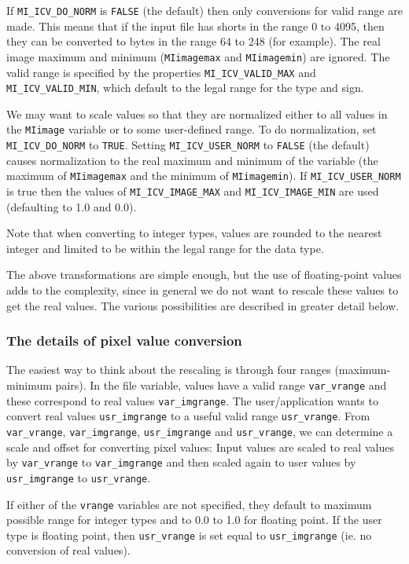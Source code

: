 If \verb+MI_ICV_DO_NORM+ is \verb+FALSE+ (the default) then only
conversions for valid range are made. This means that if the input
file has shorts in the range 0 to 4095, then they can be converted to
bytes in the range 64 to 248 (for example). The real image maximum and
minimum (\verb+MIimagemax+ and \verb+MIimagemin+) are ignored. The
valid range is specified by the properties \verb+MI_ICV_VALID_MAX+ and
\verb+MI_ICV_VALID_MIN+, which default to the legal range for the type
and sign.

We may want to scale values so that they are normalized either to all
values in the \verb+MIimage+ variable or to some user-defined range.
To do normalization, set \verb+MI_ICV_DO_NORM+ to \verb+TRUE+. Setting
\verb+MI_ICV_USER_NORM+ to \verb+FALSE+ (the default) causes normalization to
the real maximum and minimum of the variable (the maximum of
\verb+MIimagemax+ and the minimum of \verb+MIimagemin+). If
\verb+MI_ICV_USER_NORM+ is true then the values of \verb+MI_ICV_IMAGE_MAX+
and \verb+MI_ICV_IMAGE_MIN+ are used (defaulting to 1.0 and 0.0).

Note that when converting to integer types, values are rounded to the
nearest integer and limited to be within the legal range for the data
type.

The above transformations are simple enough, but the use of
floating-point values adds to the complexity, since in general we do
not want to rescale these values to get the real values. The various
possibilities are described in greater detail below.

\subsubsection{The details of pixel value conversion}

The easiest way to think about the rescaling is through four ranges
(maximum-minimum pairs). In the file variable, values have a
valid range \verb+var_vrange+ and these correspond to real values
\verb+var_imgrange+. The user/application wants to convert real values
\verb+usr_imgrange+ to a useful valid range \verb+usr_vrange+. From
\verb+var_vrange+, \verb+var_imgrange+, \verb+usr_imgrange+ and
\verb+usr_vrange+, we can determine a scale and offset for converting
pixel values: Input values are scaled to real values by
\verb+var_vrange+ to \verb+var_imgrange+ and then scaled again to user
values by \verb+usr_imgrange+ to \verb+usr_vrange+.

If either of the \verb+vrange+ variables are not specified, they default to
maximum possible range for integer types and to 0.0 to 1.0 for
floating point. If the user type is floating point, then \verb+usr_vrange+ is
set equal to \verb+usr_imgrange+ (ie. no conversion of real values).

